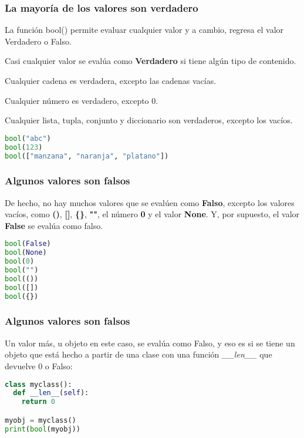 \begin{frame}[fragile]
  \frametitle{La mayoría de los valores son verdadero}

  \vspace{\baselineskip}
  La función \textcolor{codeKeyword}{bool}() permite evaluar cualquier
  valor y a cambio, regresa el valor Verdadero o Falso.

  \pausa
  \vspace{\baselineskip}
  Casi cualquier valor se evalúa como \textbf{Verdadero} si tiene algún
  tipo de contenido.

  \pausa
  \vspace{\baselineskip}
  Cualquier cadena es verdadera, excepto las cadenas vacías.

  \pausa
  \vspace{\baselineskip}
  Cualquier número es verdadero, excepto 0.

  \pausa
  \vspace{\baselineskip}
  Cualquier lista, tupla, conjunto y diccionario son verdaderos, excepto
  los vacíos.
  \begin{lstlisting}[language=Python]
bool("abc")
bool(123)
bool(["manzana", "naranja", "platano"])
  \end{lstlisting}
\end{frame}

\begin{frame}[fragile]
  \frametitle{Algunos valores son falsos}

  De hecho, no hay muchos valores que se evalúen como \textbf{Falso},
  excepto los valores vacíos, como \textbf{()}, \textbf{[]}, \textbf{\{\}},
  \textbf{""}, el número \textbf{0} y el
  valor \textbf{None}. Y, por supuesto, el valor \textbf{False} se evalúa
  como falso.

  \vspace{\baselineskip}
  \begin{lstlisting}[language=Python]
bool(False)
bool(None)
bool(0)
bool("")
bool(())
bool([])
bool({}) 
  \end{lstlisting}
\end{frame}

\begin{frame}[fragile]
  \frametitle{Algunos valores son falsos}

  Un valor más, u objeto en este caso, se evalúa como Falso, y eso es si
  se tiene un objeto que está hecho a partir de una clase con una función
  \emph{\_\_len\_\_} que devuelve 0 o Falso: 

  \vspace{\baselineskip}
  \begin{lstlisting}[language=Python]
class myclass():
  def __len__(self):
    return 0

myobj = myclass()
print(bool(myobj))
  \end{lstlisting}
\end{frame}

